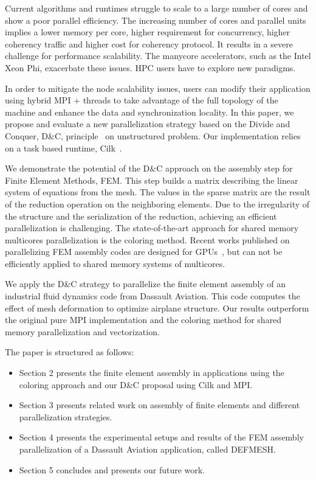 \documentclass[10pt]{IOS-Book-Article}
\begin{document}
Current algorithms and runtimes struggle to scale to a large number of cores and show a poor parallel efficiency. 
The increasing number of cores and parallel units implies a lower memory per core, higher requirement for concurrency, higher coherency traffic and higher cost for coherency protocol.
It results in a severe challenge for performance scalability. The manycore accelerators, such as the Intel Xeon Phi, exacerbate these issues.
HPC users have to explore new paradigms.

In order to mitigate the node scalability issues, users can modify their application using hybrid MPI + threads to take advantage of the full topology of the machine and enhance the data and synchronization locality.
In this paper, we propose and evaluate a new parallelization strategy based on the Divide and Conquer, D\&C, principle~\cite{dc_specfem} on unstructured problem.
Our implementation relies on a task based runtime, Cilk~\cite{cilk5}. 

We demonstrate the potential of the D\&C approach on the assembly step for Finite Element Methods, FEM.
This step builds a matrix describing the linear system of equations from the mesh.
The values in the sparse matrix are the result of the reduction operation on the neighboring elements.
Due to the irregularity of the structure and the serialization of the reduction, achieving an efficient parallelization is challenging. 
The state-of-the-art approach for shared memory multicores parallelization is the coloring method.
Recent works published on parallelizing FEM assembly codes are designed for GPUs~\cite{cecka2011assembly,CPUGPUasm}, but can not be efficiently applied to shared memory systems of multicores.

We apply the D\&C strategy to parallelize the finite element assembly of an industrial fluid dynamics code from Dassault Aviation.
This code computes the effect of mesh deformation to optimize airplane structure.
Our results outperform the original pure MPI implementation and the coloring method for shared memory parallelization and vectorization.

The paper is structured as follows:
\begin{itemize}
\item Section 2 presents the finite element assembly in applications using the coloring approach and our D\&C proposal using Cilk and MPI.
\item Section 3 presents related work on assembly of finite elements and different parallelization strategies.
\item Section 4 presents the experimental setups and results of the FEM assembly parallelization of a Dassault Aviation application, called DEFMESH.
\item Section 5 concludes and presents our future work.
\end{itemize}
\end{document}
